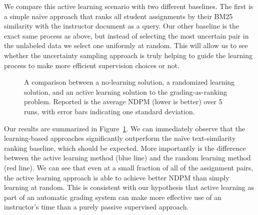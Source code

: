 We compare this active learning scenario with two different baselines. The
first is a simple na\"ive approach that ranks all student assignments by
their BM25 similarity with the instructor document as a query. Our other
baseline is the exact same process as above, but instead of selecting the
most uncertain pair in the unlabeled data we select one uniformly at
random. This will allow us to see whether the uncertainty sampling approach
is truly helping to guide the learning process to make more efficient
supervision choices or not.

\begin{figure}
  \begin{center}
  \caption{A comparison between a no-learning solution, a randomized
  learning solution, and an active learning solution to the
  grading-as-ranking problem. Reported is the average NDPM (lower is
  better) over 5 runs, with error bars indicating one standard deviation.}
  \label{fig:active-learning}
  \end{center}
\end{figure}

Our results are summarized in Figure~\ref{fig:active-learning}. We can
immediately observe that the learning-based approaches significantly
outperform the na\"ive text-similarity ranking baseline, which should be
expected. More importantly is the difference between the active learning
method (blue line) and the random learning method (red line). We can see
that even at a small fraction of all of the assignment pairs, the active
learning approach is able to achieve better NDPM than simply learning at
random. This is consistent with our hypothesis that active learning as part
of an automatic grading system can make more effective use of an
instructor's time than a purely passive supervised approach.
